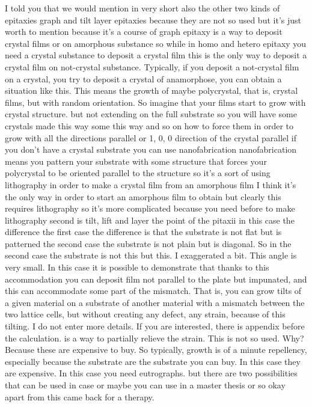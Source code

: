 I told you that we would mention in very short also the other two kinds of epitaxies graph and tilt layer epitaxies because they are not so used but it's just worth to mention because it's a course of graph epitaxy is a way to deposit crystal films or on amorphous substance so while in homo and hetero epitaxy you need a crystal substance to deposit a crystal film this is the only way to deposit a crystal film on not-crystal substance. Typically, if you deposit a not-crystal film on a crystal, you try to deposit a crystal of anamorphose, you can obtain a situation like this. This means the growth of maybe polycrystal, that is, crystal films, but with random orientation. So imagine that your films start to grow with crystal structure. but not extending on the full substrate so you will have some crystals made this way some this way and so on how to force them in order to grow with all the directions parallel or 1, 0, 0 direction of the crystal parallel if you don't have a crystal substrate you can use nanofabrication nanofabrication means you pattern your substrate with some structure that forces your polycrystal to be oriented parallel to the structure so it's a sort of using lithography in order to make a crystal film from an amorphous film I think it's the only way in order to start an amorphous film to obtain but clearly this requires lithography so it's more complicated because you need before to make lithography second is tilt, lift and layer the point of the pitaxii in this case the difference the first case the difference is that the substrate is not flat but is patterned the second case the substrate is not plain but is diagonal. So in the second case the substrate is not this but this. I exaggerated a bit. This angle is very small. In this case it is possible to demonstrate that thanks to this accommodation you can deposit film not parallel to the plate but impunated, and this can accommodate some part of the mismatch. That is, you can grow tilts of a given material on a substrate of another material with a mismatch between the two lattice cells, but without creating any defect, any strain, because of this tilting. I do not enter more details. If you are interested, there is appendix before the calculation. is a way to partially relieve the strain. This is not so used. Why? Because these are expensive to buy. So typically, growth is of a minute repellency, especially because the substrate are the substrate you can buy. In this case they are expensive. In this case you need eutrographs. but there are two possibilities that can be used in case or maybe you can use in a master thesis or so okay apart from this came back for a therapy.
